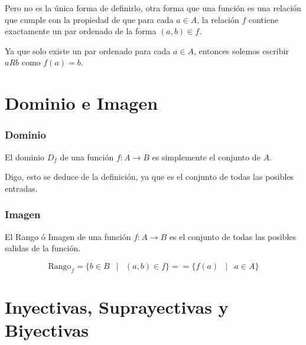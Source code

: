\documentclass[12pt]{report}                                    %
\DeclareMathOperator \Space {\quad}                             %
\DeclareMathOperator \MiniSpace {\;}                            %
\newcommand \Such {\MiniSpace|\MiniSpace}                       %
\begin{document}
        Pero no es la única forma de definirlo, otra forma que una función es una relación que 
        cumple con la propiedad de que para cada $a \in A$, la relación $f$ contiene exactamente
        un par ordenado de la forma $(a,b) \in f$.

        Ya que solo existe un par ordenado para cada $a \in A$, entonces solemos escribir 
        $aRb$ como $f(a) = b$.







    \clearpage
    \section{Dominio e Imagen}
        
        \subsubsection*{Dominio}

            El dominio $D_f$ de una función $f : A \to B$ es simplemente el conjunto de $A$.

            Digo, esto se deduce de la definición, ya que es el conjunto de todas las posibles
            entradas.

        \subsubsection*{Imagen}

            El Rango ó Imagen de una función $f : A \to B$ es el conjunto de todas las posibles salidas
            de la función.

            \begin{equation}
                \text{Rango}_f = \{ b \in B \Such (a,b) \in f \} = = \{ f(a) \Such a \in A \}
            \end{equation}






    \clearpage
    \section{Inyectivas, Suprayectivas y Biyectivas}
\end{document}
